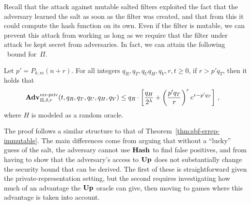 
Recall that the  attack against mutable salted filters exploited the fact that
the adversary learned the salt as soon as the filter was created, and that from
this it could compute the hash function on its own. Even if the filter is
mutable, we can prevent this attack from working as long as we require that the
filter under attack be kept secret from adversaries. In fact, we can attain the
following \erreps\ bound for~$\Pi$.

\begin{theorem}\label{thm:sbf-erreps}
  Let $p' = P_{k,m}(n+r)$.
  For all integers $q_R, q_T, q_U q_H, q_V, r, t \geq 0$, if
  $r > p'q_T$, then it holds that
  \begin{eqnarray*}
    \begin{aligned}
      \Adv{\erreps}_{\Pi,\delta,r}(t,\,&q_R, q_T, q_U, q_H, q_V) \leq q_R \cdot \left[
      \frac{q_H}{2^\lambda} +
      \left(\frac{p'q_T}{r}\right)^re^{r-p'q_T}\right]\,,
    \end{aligned}
\end{eqnarray*}
  where $H$ is modeled as a random oracle.
\end{theorem}

The proof follows a similar structure to that of
Theorem~\ref{thm:sbf-errep-immutable}. The main differences come from arguing
that without a ``lucky'' guess of the salt, the adversary cannot use $\textup{\textbf{Hash}}\hspace{0.5pt}$ to
find false positives, and from having to show that the adversary's access to
$\textup{\textbf{Up}}\hspace{0.5pt}$ does not substantially change the security bound that can be derived. The
first of these is straightforward given the private-representation setting, but
the second requires investigating how much of an advantage the $\textup{\textbf{Up}}\hspace{0.5pt}$ oracle can
give, then moving to games where this advantage is taken into account.



